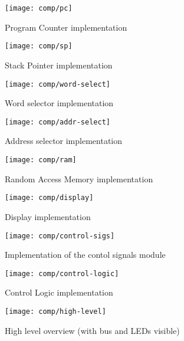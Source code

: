   \begin{figure}[h]
    \centering
    \texttt{[image: comp/pc]}
    \caption{Program Counter implementation}
    \label{pc-i}
  \end{figure}

  \begin{figure}[h]
    \centering
    \texttt{[image: comp/sp]}
    \caption{Stack Pointer implementation}
    \label{sp-i}
  \end{figure}

  \begin{figure}[h]
    \centering
    \texttt{[image: comp/word-select]}
    \caption{Word selector implementation}
    \label{word-select-i}
  \end{figure}

  \begin{figure}[h]
    \centering
    \texttt{[image: comp/addr-select]}
    \caption{Address selector implementation}
    \label{addr-select-i}
  \end{figure}

  \begin{figure}[h]
    \centering
    \texttt{[image: comp/ram]}
    \caption{Random Access Memory implementation}
    \label{ram-i}
  \end{figure}

  \begin{figure}[h]
    \centering
    \texttt{[image: comp/display]}
    \caption{Display implementation}
    \label{display-i}
  \end{figure}

  \begin{figure}[h]
    \centering
    \texttt{[image: comp/control-sigs]}
    \caption{Implementation of the contol signals module}
    \label{control-sigs-i}
  \end{figure}

  \begin{figure}[h]
    \centering
    \texttt{[image: comp/control-logic]}
    \caption{Control Logic implementation}
    \label{control-logic-i}
  \end{figure}

  \begin{figure}[h]
    \centering
    \texttt{[image: comp/high-level]}
    \caption{High level overview (with bus and LEDs visible)}
    \label{high-level-i}
  \end{figure}

\cleardoublepage
\cleardoublepage
